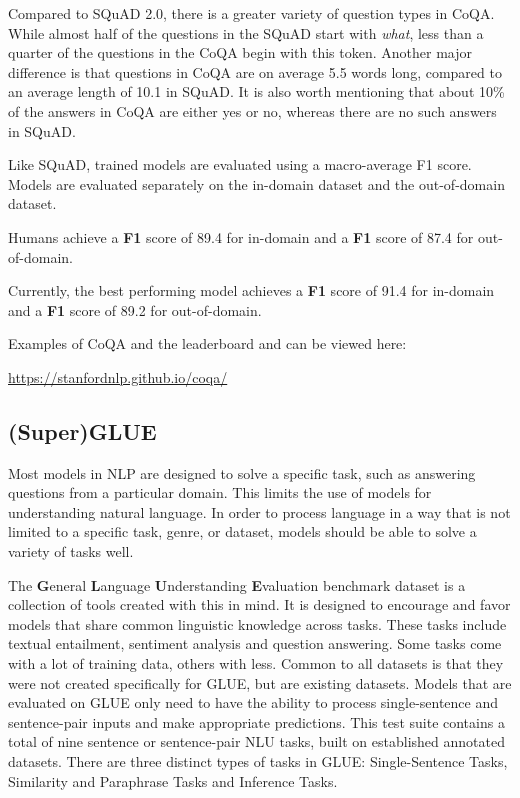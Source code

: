\documentclass[]{krantz}
\begin{document}
Compared to SQuAD 2.0, there is a greater variety of question types in CoQA. While almost half of the questions in the SQuAD start with \emph{what}, less than a quarter of the questions in the CoQA begin with this token. Another major difference is that questions in CoQA are on average 5.5 words long, compared to an average length of 10.1 in SQuAD. It is also worth mentioning that about 10\% of the answers in CoQA are either yes or no, whereas there are no such answers in SQuAD.

Like SQuAD, trained models are evaluated using a macro-average F1 score. Models are evaluated separately on the in-domain dataset and the out-of-domain dataset. \citep{coqa2019}

Humans achieve a \textbf{F1} score of 89.4 for in-domain and a \textbf{F1} score of 87.4 for out-of-domain.

Currently, the best performing model achieves a \textbf{F1} score of 91.4 for in-domain and a \textbf{F1} score of 89.2 for out-of-domain.

Examples of CoQA and the leaderboard and can be viewed here:

\center \url{https://stanfordnlp.github.io/coqa/}

\flushleft

\hypertarget{superglue}{%
\subsection{(Super)GLUE}\label{superglue}}

Most models in NLP are designed to solve a specific task, such as answering questions from a particular domain. This limits the use of models for understanding natural language. In order to process language in a way that is not limited to a specific task, genre, or dataset, models should be able to solve a variety of tasks well.

The \textbf{G}eneral \textbf{L}anguage \textbf{U}nderstanding \textbf{E}valuation benchmark dataset is a collection of tools created with this in mind. It is designed to encourage and favor models that share common linguistic knowledge across tasks. These tasks include textual entailment, sentiment analysis and question answering. Some tasks come with a lot of training data, others with less. Common to all datasets is that they were not created specifically for GLUE, but are existing datasets. Models that are evaluated on GLUE only need to have the ability to process single-sentence and sentence-pair inputs and make appropriate predictions.
This test suite contains a total of nine sentence or sentence-pair NLU tasks, built on established annotated datasets. There are three distinct types of tasks in GLUE: Single-Sentence Tasks, Similarity and Paraphrase Tasks and Inference Tasks.
\end{document}
